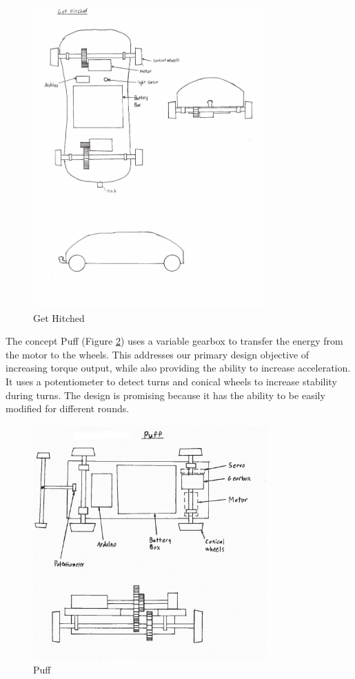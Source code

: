 \documentclass[class=../report, crop=false]{standalone}
\begin{document}
\begin{figure}[H]
	\centering
	\includegraphics[width=0.8\textwidth]{../res/img/gethitched}
	\caption{Get Hitched}
	\label{fig:gethitched}
\end{figure}

\clearpage

The concept Puff (Figure \ref{fig:puff}) uses a variable gearbox to transfer the energy from the motor to the wheels.
This addresses our primary design objective of increasing torque output, while also providing the ability to increase acceleration.
It uses a potentiometer to detect turns and conical wheels to increase stability during turns.
The design is promising because it has the ability to be easily modified for different rounds.

\begin{figure}[H]
	\centering
	\includegraphics[width=0.8\textwidth]{../res/img/puff}
	\caption{Puff}
	\label{fig:puff}
\end{figure}
\end{document}
